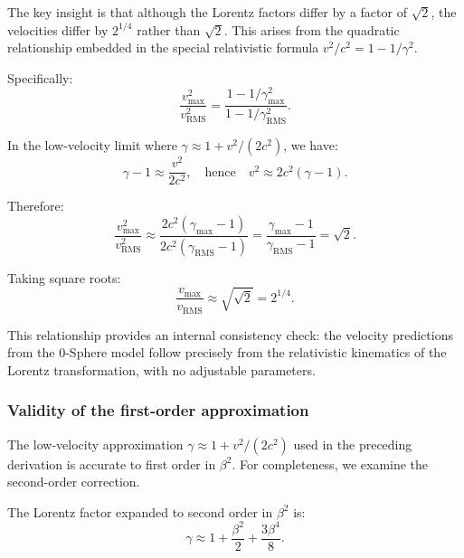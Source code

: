\documentclass[12pt,letterpaper]{article}
\begin{document}
The key insight is that although the Lorentz factors differ by a factor of $\sqrt{2}$, the velocities differ by $2^{1/4}$ rather than $\sqrt{2}$. This arises from the quadratic relationship embedded in the special relativistic formula $v^2/c^2 = 1 - 1/\gamma^2$.

Specifically:
\begin{equation}
\frac{v_{\max}^2}{v_{\mathrm{RMS}}^2} = \frac{1 - 1/\gamma_{\max}^2}{1 - 1/\gamma_{\mathrm{RMS}}^2}.
\end{equation}

In the low-velocity limit where $\gamma \approx 1 + v^2/(2c^2)$, we have:
\begin{equation}
\gamma - 1 \approx \frac{v^2}{2c^2}, \quad \text{hence} \quad v^2 \approx 2c^2(\gamma - 1).
\end{equation}

Therefore:
\begin{equation}
\frac{v_{\max}^2}{v_{\mathrm{RMS}}^2} \approx \frac{2c^2(\gamma_{\max} - 1)}{2c^2(\gamma_{\mathrm{RMS}} - 1)} = \frac{\gamma_{\max} - 1}{\gamma_{\mathrm{RMS}} - 1} = \sqrt{2}.
\end{equation}

Taking square roots:
\begin{equation}
\frac{v_{\max}}{v_{\mathrm{RMS}}} \approx \sqrt{\sqrt{2}} = 2^{1/4}.
\end{equation}

This relationship provides an internal consistency check: the velocity predictions from the 0-Sphere model follow precisely from the relativistic kinematics of the Lorentz transformation, with no adjustable parameters.

\subsubsection{Validity of the first-order approximation}

The low-velocity approximation $\gamma \approx 1 + v^2/(2c^2)$ used in the preceding derivation is accurate to first order in $\beta^2$. For completeness, we examine the second-order correction.

The Lorentz factor expanded to second order in $\beta^2$ is:
\begin{equation}
\gamma \approx 1 + \frac{\beta^2}{2} + \frac{3\beta^4}{8}.
\end{equation}
\end{document}
